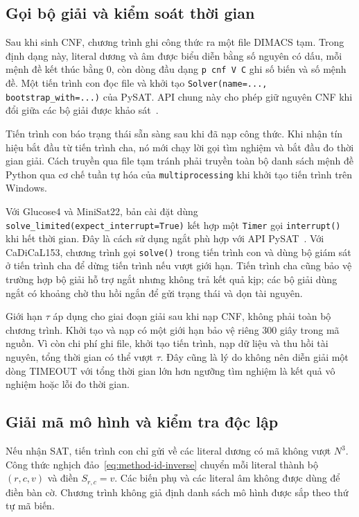 \documentclass[a4paper,fleqn]{cas-sc}
\begin{document}
\subsection{Gọi bộ giải và kiểm soát thời gian}

Sau khi sinh CNF, chương trình ghi công thức ra một file DIMACS tạm.
Trong định dạng này, literal dương và âm được biểu diễn bằng số nguyên
có dấu, mỗi mệnh đề kết thúc bằng $0$, còn dòng đầu dạng
\texttt{p cnf V C} ghi số biến và số mệnh đề.
Một tiến trình con đọc file và khởi tạo
\texttt{Solver(name=..., bootstrap\_with=...)} của PySAT.
API chung này cho phép giữ nguyên CNF khi đổi giữa các bộ giải
được khảo sát~.

Tiến trình con báo trạng thái sẵn sàng sau khi đã nạp công thức. Khi
nhận tín hiệu bắt đầu từ tiến trình cha, nó mới chạy lời gọi tìm nghiệm
và bắt đầu đo thời gian giải. Cách truyền qua file tạm tránh phải truyền
toàn bộ danh sách mệnh đề Python qua cơ chế tuần tự hóa của
\texttt{multiprocessing} khi khởi tạo tiến trình trên Windows.

Với Glucose4 và MiniSat22, bản cài đặt dùng
\texttt{solve\_limited(expect\_interrupt=True)} kết hợp một
\texttt{Timer} gọi \texttt{interrupt()} khi hết thời gian.
Đây là cách sử dụng ngắt phù hợp với API PySAT~.
Với CaDiCaL153, chương trình gọi \texttt{solve()} trong tiến trình con
và dùng bộ giám sát ở tiến trình cha để dừng tiến trình nếu vượt giới
hạn. Tiến trình cha cũng bảo vệ trường hợp bộ giải hỗ trợ ngắt nhưng
không trả kết quả kịp; các bộ giải dùng ngắt có khoảng chờ thu hồi ngắn
để gửi trạng thái và dọn tài nguyên.

Giới hạn $\tau$ áp dụng cho giai đoạn giải sau khi nạp CNF, không phải
toàn bộ chương trình. Khởi tạo và nạp có một giới hạn bảo vệ riêng
$300$ giây trong mã nguồn. Vì còn chi phí ghi file, khởi tạo tiến trình,
nạp dữ liệu và thu hồi tài nguyên, tổng thời gian có thể vượt $\tau$.
Đây cũng là lý do không nên diễn giải một dòng TIMEOUT với tổng thời
gian lớn hơn ngưỡng tìm nghiệm là kết quả vô nghiệm hoặc lỗi đo thời gian.

\subsection{Giải mã mô hình và kiểm tra độc lập}

Nếu nhận SAT, tiến trình con chỉ gửi về các literal dương có mã không
vượt $N^3$. Công thức nghịch đảo~\eqref{eq:method-id-inverse} chuyển
mỗi literal thành bộ $(r,c,v)$ và điền $S_{r,c}=v$.
Các biến phụ và các literal âm không được dùng để điền bàn cờ. Chương
trình không giả định danh sách mô hình được sắp theo thứ tự mã biến.
\end{document}
